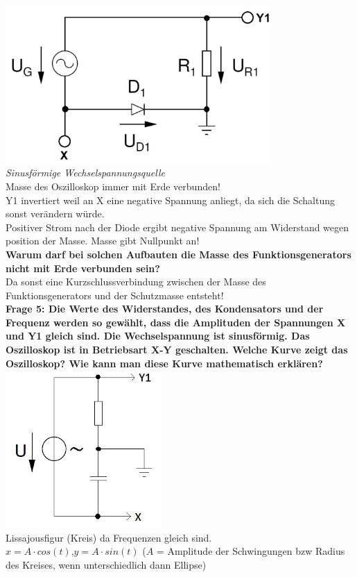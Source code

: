 \documentclass[11pt,a4paper]{scrartcl}
\begin{document}
\includegraphics[height=6cm,keepaspectratio]{Oszi_Schaltung.png}\\
\textit{Sinusförmige Wechselspannungsquelle}\\
Masse des Oszilloskop immer mit Erde verbunden!\\
Y1 invertiert weil an X eine negative Spannung anliegt, da sich die Schaltung sonst verändern würde.\\
Positiver Strom nach der Diode ergibt negative Spannung am Widerstand wegen position der Masse. Masse gibt Nullpunkt an!\\
\textbf{Warum darf bei solchen Aufbauten die Masse des Funktionsgenerators nicht mit Erde verbunden sein?}\\
Da sonst eine Kurzschlussverbindung zwischen der Masse des Funktionsgenerators und der Schutzmasse entsteht!\\
\textbf{Frage 5: Die Werte des Widerstandes, des Kondensators und der Frequenz werden so gewählt, dass die Amplituden der Spannungen X und Y1 gleich sind. Die Wechselspannung ist sinusförmig. Das Oszilloskop ist in Betriebsart X-Y geschalten. Welche Kurve zeigt das Oszilloskop? Wie kann man diese Kurve mathematisch erklären?}\\
\includegraphics[height=6cm,keepaspectratio]{Oszi_Widerstand.png}\\
Lissajousfigur (Kreis) da Frequenzen gleich sind.\\
$x=A \cdot cos(t)$,$y=A \cdot sin(t)$ ($A$ = Amplitude der Schwingungen bzw Radius des Kreises, wenn unterschiedlich dann Ellipse)\\
\end{document}
